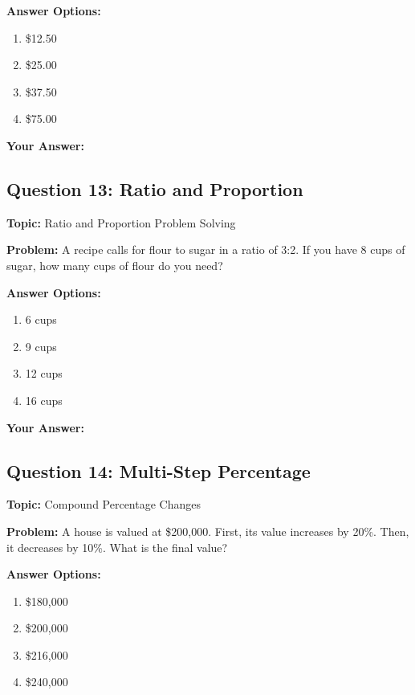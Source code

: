 \documentclass[12pt]{article}
\begin{document}
\textbf{Answer Options:}
\begin{enumerate}[label=\Alph*)]
    \item \$12.50
    \item \$25.00
    \item \$37.50
    \item \$75.00
\end{enumerate}

\noindent\textbf{Your Answer:} \underline{\hspace{2cm}}

\vspace{0.5cm}


\subsection{Question 13: Ratio and Proportion}
\textbf{Topic:} Ratio and Proportion Problem Solving

\textbf{Problem:} A recipe calls for flour to sugar in a ratio of 3:2. If you have 8 cups of sugar, how many cups of flour do you need?

\textbf{Answer Options:}
\begin{enumerate}[label=\Alph*)]
    \item 6 cups
    \item 9 cups
    \item 12 cups
    \item 16 cups
\end{enumerate}

\noindent\textbf{Your Answer:} \underline{\hspace{2cm}}

\vspace{0.5cm}


\subsection{Question 14: Multi-Step Percentage}
\textbf{Topic:} Compound Percentage Changes

\textbf{Problem:} A house is valued at \$200,000. First, its value increases by 20\%. Then, it decreases by 10\%. What is the final value?

\textbf{Answer Options:}
\begin{enumerate}[label=\Alph*)]
    \item \$180,000
    \item \$200,000
    \item \$216,000
    \item \$240,000
\end{enumerate}
\end{document}
